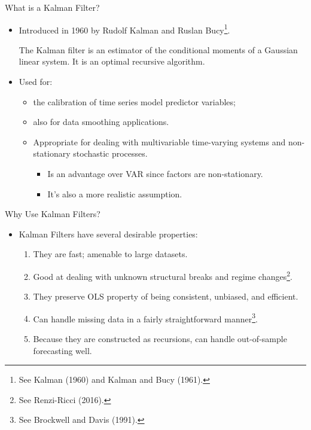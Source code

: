 \documentclass[dvipsnames,mathserif]{beamer}
\begin{document}
{\begin{frame}{What is a Kalman Filter?}
	\begin{itemize}
		\item Introduced in 1960 by Rudolf Kalman and Ruslan Bucy\footnote{\tiny See Kalman (1960) and Kalman and Bucy (1961).}. 
		\begin{block}{}
			The Kalman filter is an estimator of the conditional moments of a Gaussian linear system. It is an optimal recursive algorithm.
		\end{block}
		\item Used for:
		\begin{itemize}
			\item the calibration of time series model predictor variables; 
			\item also for data smoothing applications. 
			\item Appropriate for dealing with multivariable time-varying systems and non-stationary stochastic processes.
			\begin{itemize}
				\item Is an advantage over VAR since factors are non-stationary. 
				\item It's also a more realistic assumption.
			\end{itemize}
		\end{itemize}
	\end{itemize}
\end{frame}


\begin{frame}{Why Use Kalman Filters?}
	\begin{itemize}
		\item Kalman Filters have several desirable properties:
		\begin{enumerate}
			\item They are fast; amenable to large datasets.
			\item Good at dealing with unknown structural breaks and regime changes\footnote{\tiny See Renzi-Ricci (2016).}. 
			\item They preserve OLS property of being consistent, unbiased, and efficient.
			\item Can handle missing data in a fairly straightforward manner\footnote{\tiny See Brockwell and Davis (1991).}.
			\item Because they are constructed as recursions, can handle out-of-sample forecasting well.
		\end{enumerate}
	\end{itemize}
\end{frame}

}
\end{document}
